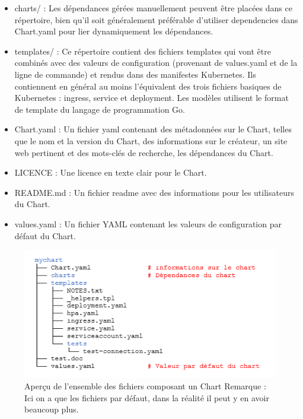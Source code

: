 \documentclass[11pt,fleqn]{book} %
\begin{document}
\begin{itemize}
        \item charts/ : Les dépendances gérées manuellement peuvent être placées dans ce répertoire, bien qu'il soit généralement préférable d'utiliser dependencies dans Chart.yaml pour lier dynamiquement les dépendances.
        \item templates/ : Ce répertoire contient des fichiers templates qui vont être combinés avec des valeurs de configuration (provenant de values.yaml et de la ligne de commande) et rendus dans des manifestes Kubernetes. Ils contiennent en général au moins l'équivalent des trois fichiers basiques de Kubernetes : ingress, service et deployment. Les modèles utilisent le format de template du langage de programmation Go.
        \item Chart.yaml : Un fichier yaml contenant des métadonnées sur le Chart, telles que le nom et la version du Chart, des informations sur le créateur, un site web pertinent et des mots-clés de recherche, les dépendances du Chart.
      \item LICENCE : Une licence en texte clair pour le Chart.
     \item README.md : Un fichier readme avec des informations pour les utilisateurs du Chart.
      \item values.yaml : Un fichier YAML contenant les valeurs de configuration par défaut du Chart.\newline
\end{itemize} 

\begin{figure}[H]\centering
\renewcommand{\figurename}{Capture d'écran}
\includegraphics[scale=0.8]{Pictures/Comparaison/deployer/Kubernetes/helmChart.png}
\captionsetup{margin=1.5cm,format=hang,justification=justified}
\caption[]{Aperçu de l'ensemble des fichiers composant un Chart\newline
Remarque : Ici on a que les fichiers par défaut, dans la réalité il peut y en avoir beaucoup plus. \newline}
\end{figure}
\end{document}
